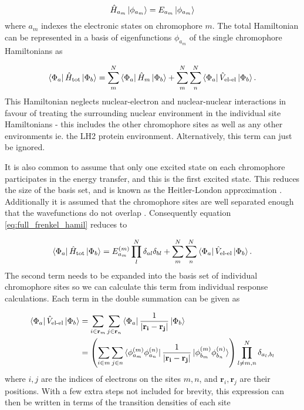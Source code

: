 \begin{equation}
\hat{H}_{a_m} \ket{\phi_{a_m}} = E_{a_m} \ket{\phi_{a_m}}
\end{equation}
%
where ${a_m}$ indexes the electronic states on chromophore $m$. The total Hamiltonian
can be represented in a basis of eigenfunctions $\phi_{a_m}$ of the single chromophore 
Hamiltonians as

\begin{equation}
\bra{\Phi_a} \hat{H}_{\text{tot}}\ket{\Phi_b} = \sum^N_m \bra{\Phi_a} \hat{H}_{m}\ket{\Phi_b} + \sum^N_m \sum^N_n \bra{\Phi_a} \hat{V}_{\text{el-el}}\ket{\Phi_b}.
\label{eq:full_frenkel_hamil}
\end{equation}
%
This Hamiltonian neglects nuclear-electron and nuclear-nuclear interactions in favour
of treating the surrounding nuclear environment in the individual site Hamiltonians 
\cite{Scholes2003} - this includes the other chromophore sites as well as any other 
environments ie. the LH2 protein environment. Alternatively, this term can just be ignored.

It is also common to assume that only one excited state on each chromophore participates
in the energy transfer, and this is the first excited state. This reduces the size 
of the basis set, and is known as the Heitler-London approximation \cite{Agranovich2000}.
Additionally it is assumed that the chromophore sites are well separated enough 
that the wavefunctions do not overlap \cite{Frenkel1931}. Consequently equation 
\ref{eq:full_frenkel_hamil} reduces to

\begin{equation}
\bra{\Phi_a} \hat{H}_{\text{tot}}\ket{\Phi_b} = E^{\left(m\right)}_{a_m} \prod^N_l \delta_{al} \delta_{bl} + \sum^N_m \sum^N_n \bra{\Phi_a} \hat{V}_{\text{el-el}}\ket{\Phi_b}.
\label{eq:reduced_frenkel_hamil}
\end{equation}
%
The second term needs to be expanded into the basis set of individual chromophore 
sites so we can calculate this term from individual response calculations. Each 
term in the double summation can be given as

\begin{equation}
\begin{aligned}
\bra{\Phi_a} \hat{V}_{\text{el-el}}\ket{\Phi_b} &= \sum_{i \in \mathbf{r}_m} \sum_{j \in \mathbf{r}_n} \bra{\Phi_a} \frac{1}{\left|\mathbf{r_i} - \mathbf{r_j}\right|} \ket{\Phi_b} \\
&= \left(\sum_{i \in m} \sum_{j \in n} \bra{\phi^{\left(m\right)}_{a_m} \phi^{\left(n\right)}_{a_n}} \frac{1}{\left|\mathbf{r_i} - \mathbf{r_j}\right|} \ket{\phi^{\left(m\right)}_{b_m}\phi^{\left(n\right)}_{b_n}}\right)\prod^N_{l\neq m,n}\delta_{a_l, b_l}
\end{aligned}
\end{equation}
%
where $i,j$ are the indices of electrons on the sites $m,n$, and $\mathbf{r}_i, 
\mathbf{r}_j$ are their positions. With a few extra steps not included for brevity,
this expression can then be written in terms of the transition densities of each 
site\cite{Scholes2003}

